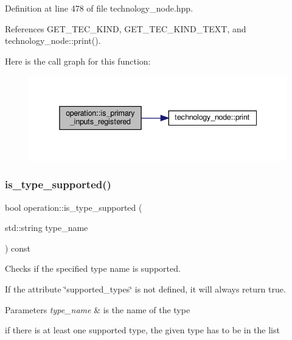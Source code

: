 Definition at line 478 of file technology\+\_\+node.\+hpp.



References G\+E\+T\+\_\+\+T\+E\+C\+\_\+\+K\+I\+ND, G\+E\+T\+\_\+\+T\+E\+C\+\_\+\+K\+I\+N\+D\+\_\+\+T\+E\+XT, and technology\+\_\+node\+::print().

Here is the call graph for this function\+:
\nopagebreak
\begin{figure}[H]
\begin{center}
\leavevmode
\includegraphics[width=338pt]{d9/dc0/structoperation_ab72f8bdde321945d4b616b562c4bc472_cgraph}
\end{center}
\end{figure}
\mbox{\label{structoperation_a271a2bcd8bf499be5df7ae05edb8b64f}} 
\subsubsection{\texorpdfstring{is\+\_\+type\+\_\+supported()}{is\_type\_supported()}\hspace{0.1cm}{\footnotesize\ttfamily [1/3]}}
{\footnotesize\ttfamily bool operation\+::is\+\_\+type\+\_\+supported (\begin{DoxyParamCaption}\item[{std\+::string}]{type\+\_\+name }\end{DoxyParamCaption}) const}



Checks if the specified type name is supported. 

If the attribute \char`\"{}supported\+\_\+types\char`\"{} is not defined, it will always return true. 
\begin{DoxyParams}{Parameters}
{\em type\+\_\+name} & is the name of the type \\
\hline
\end{DoxyParams}
if there is at least one supported type, the given type has to be in the list 

